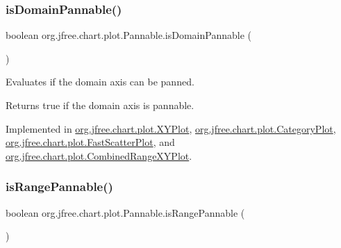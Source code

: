\mbox{\label{interfaceorg_1_1jfree_1_1chart_1_1plot_1_1_pannable_a732908d75e7c0b1fab688d9a29ff3e44}} 
\subsubsection{\texorpdfstring{is\+Domain\+Pannable()}{isDomainPannable()}}
{\footnotesize\ttfamily boolean org.\+jfree.\+chart.\+plot.\+Pannable.\+is\+Domain\+Pannable (\begin{DoxyParamCaption}{ }\end{DoxyParamCaption})}

Evaluates if the domain axis can be panned.

\begin{DoxyReturn}{Returns}
{\ttfamily true} if the domain axis is pannable. 
\end{DoxyReturn}


Implemented in \mbox{\hyperlink{classorg_1_1jfree_1_1chart_1_1plot_1_1_x_y_plot_a47e998c45ef12fd238c3477c38655c2b}{org.\+jfree.\+chart.\+plot.\+X\+Y\+Plot}}, \mbox{\hyperlink{classorg_1_1jfree_1_1chart_1_1plot_1_1_category_plot_ac365d760808474f7b01fb0642a956f93}{org.\+jfree.\+chart.\+plot.\+Category\+Plot}}, \mbox{\hyperlink{classorg_1_1jfree_1_1chart_1_1plot_1_1_fast_scatter_plot_af6289348bf124d368a03a593443a53e4}{org.\+jfree.\+chart.\+plot.\+Fast\+Scatter\+Plot}}, and \mbox{\hyperlink{classorg_1_1jfree_1_1chart_1_1plot_1_1_combined_range_x_y_plot_acc7049319fcef4aa176c61535cdef530}{org.\+jfree.\+chart.\+plot.\+Combined\+Range\+X\+Y\+Plot}}.

\mbox{\label{interfaceorg_1_1jfree_1_1chart_1_1plot_1_1_pannable_ad1e4f1dde36baf9964ac14654aab4f8e}} 
\subsubsection{\texorpdfstring{is\+Range\+Pannable()}{isRangePannable()}}
{\footnotesize\ttfamily boolean org.\+jfree.\+chart.\+plot.\+Pannable.\+is\+Range\+Pannable (\begin{DoxyParamCaption}{ }\end{DoxyParamCaption})}

